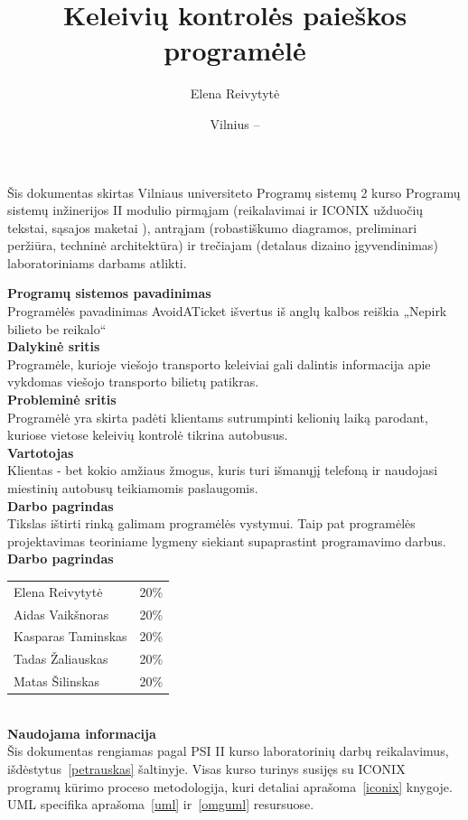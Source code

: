 \documentclass{VUMIFPSkursinis}
\title{Keleivių kontrolės paieškos programėlė}
\author{Elena Reivytytė}
\date{Vilnius – \the\year}
\begin{document}
\maketitle

Šis dokumentas skirtas Vilniaus universiteto Programų sistemų 2 kurso Programų sistemų inžinerijos II modulio pirmąjam (reikalavimai ir ICONIX užduočių tekstai, sąsajos maketai ), antrąjam (robastiškumo diagramos, preliminari peržiūra, techninė architektūra) ir trečiajam (detalaus dizaino įgyvendinimas) laboratoriniams darbams atlikti.

\tableofcontents

\noindent
\textbf{Programų sistemos pavadinimas}\\
Programėlės pavadinimas AvoidATicket išvertus iš anglų kalbos reiškia „Nepirk bilieto be reikalo“\\
\textbf{Dalykinė sritis}\\
Programėle, kurioje viešojo transporto keleiviai gali dalintis informacija apie vykdomas viešojo transporto bilietų patikras.\\
\textbf{Probleminė sritis}\\
Programėlė yra skirta padėti klientams sutrumpinti kelionių laiką parodant, kuriose vietose keleivių kontrolė tikrina autobusus.\\
\textbf{Vartotojas}\\
Klientas - bet kokio amžiaus žmogus, kuris turi išmanųjį telefoną ir naudojasi miestinių autobusų teikiamomis paslaugomis.\\
\textbf{Darbo pagrindas}\\
Tikslas ištirti rinką galimam programėlės vystymui. Taip pat programėlės projektavimas teoriniame lygmeny siekiant supaprastint programavimo darbus.\\
\textbf{Darbo pagrindas}\\
\begin{tabular}{lr}
   Elena Reivytytė & 20\% \\
   Aidas Vaikšnoras & 20\% \\
   Kasparas Taminskas & 20\% \\
   Tadas Žaliauskas & 20\% \\
   Matas Šilinskas & 20\% \\
\end{tabular}
\\
\textbf{Naudojama informacija}\\
Šis dokumentas rengiamas pagal PSI II kurso laboratorinių darbų reikalavimus, išdėstytus~\ref{petrauskas} šaltinyje. Visas kurso turinys susijęs su ICONIX programų kūrimo proceso metodologija,
kuri detaliai aprašoma~\ref{iconix} knygoje. UML specifika aprašoma~\ref{uml} ir~\ref{omguml} resursuose.
\end{document}

